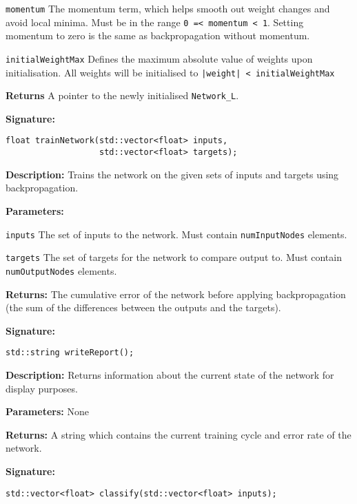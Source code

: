 \documentclass[a4paper]{article}
\begin{document}
\lstinline{momentum} The momentum term, which helps smooth out weight changes and avoid local minima. Must be in the range \lstinline{0 =< momentum < 1}. Setting momentum to zero is the same as backpropagation without momentum.

\lstinline{initialWeightMax} Defines the maximum absolute value of weights upon initialisation. All weights will be initialised to \lstinline{|weight| < initialWeightMax} 

\textbf{Returns}
A pointer to the newly initialised \lstinline{Network_L}.

\hrulefill %

\textbf{Signature:} \begin{lstlisting}
float trainNetwork(std::vector<float> inputs,
                   std::vector<float> targets);
\end{lstlisting}

\textbf{Description: }
Trains the network on the given sets of inputs and targets using backpropagation.

\textbf{Parameters: }

\lstinline{inputs} The set of inputs to the network. Must contain \lstinline{numInputNodes} elements.

\lstinline{targets} The set of targets for the network to compare output to. Must contain \lstinline{numOutputNodes} elements.

\textbf{Returns: }
The cumulative error of the network before applying backpropagation (the sum of the differences between the outputs and the targets).

\hrulefill %

\textbf{Signature:} \begin{lstlisting}
std::string writeReport();
\end{lstlisting}

\textbf{Description: }
Returns information about the current state of the network for display purposes.

\textbf{Parameters: } None

\textbf{Returns: }
A string which contains the current training cycle and error rate of the network.

\hrulefill %

\textbf{Signature:} \begin{lstlisting}
std::vector<float> classify(std::vector<float> inputs);
\end{lstlisting}
\end{document}

